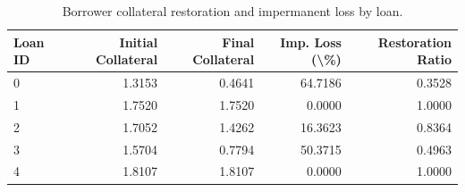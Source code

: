 \begin{table}
\caption{Borrower collateral restoration and impermanent loss by loan.}
\label{tab:impermanent_loss}
\begin{tabular}{lrrrr}
\toprule
Loan ID & Initial Collateral & Final Collateral & Imp. Loss (\textbackslash \%) & Restoration Ratio \\
\midrule
0 & 1.3153 & 0.4641 & 64.7186 & 0.3528 \\
1 & 1.7520 & 1.7520 & 0.0000 & 1.0000 \\
2 & 1.7052 & 1.4262 & 16.3623 & 0.8364 \\
3 & 1.5704 & 0.7794 & 50.3715 & 0.4963 \\
4 & 1.8107 & 1.8107 & 0.0000 & 1.0000 \\
\bottomrule
\end{tabular}
\end{table}
